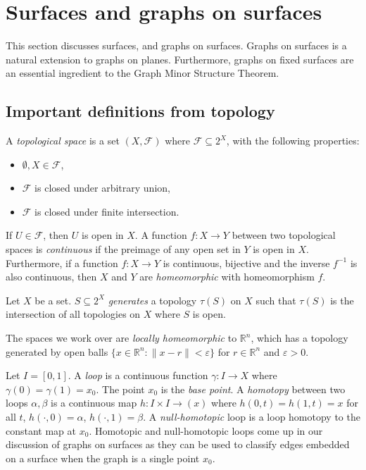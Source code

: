 \section{Surfaces and graphs on surfaces}
This section discusses surfaces, and graphs on surfaces. Graphs on surfaces is a natural extension to graphs on planes. Furthermore, graphs on fixed surfaces are an essential ingredient to the Graph Minor Structure Theorem.

\subsection{Important definitions from topology}
A \textit{topological space} is a set $(X, \mathcal{F})$ where $\mathcal{F} \subseteq 2^X$, with the following properties:
\begin{itemize}
    \item $\emptyset, X \in \mathcal{F}$,
    \item $\mathcal{F}$ is closed under arbitrary union,
    \item $\mathcal{F}$ is closed under finite intersection.
\end{itemize} 
If $U \in \mathcal{F}$, then $U$ is open in $X$. A function $f : X \rightarrow Y$ between two topological spaces is \textit{continuous} if the preimage of any open set in $Y$ is open in $X$. Furthermore, if a function $f : X \rightarrow Y$ is continuous, bijective and the inverse $f^{-1}$ is also continuous, then $X$ and $Y$ are \textit{homeomorphic} with homeomorphism $f$. 

Let $X$ be a set. $S \subseteq 2^X$ \textit{generates} a topology $\tau(S)$ on $X$ such that $\tau(S)$ is the intersection of all topologies on $X$ where $S$ is open. 

The spaces we work over are \textit{locally homeomorphic} to $\mathbb{R}^n$, which has a topology generated by open balls $\{x \in \mathbb{R}^n: \| x - r \| < \varepsilon\}$ for $r \in \mathbb{R}^n$ and $\varepsilon > 0$.

Let $I = [0, 1]$.
A \textit{loop} is a continuous function $\gamma : I \rightarrow X$ where $\gamma(0) = \gamma(1) = x_0$. The point $x_0$ is the \textit{base point}. A \textit{homotopy} between two loops $\alpha, \beta$ is a continuous map $h : I \times I \rightarrow (x)$ where $h(0, t) = h(1, t) = x$ for all $t$, $h(\cdot, 0) = \alpha$, $h(\cdot, 1) = \beta$. A \textit{null-homotopic} loop is a loop homotopy to the constant map at $x_0$. Homotopic and null-homotopic loops come up in our discussion of graphs on surfaces as they can be used to classify edges embedded on a surface when the graph is a single point $x_0$. 


